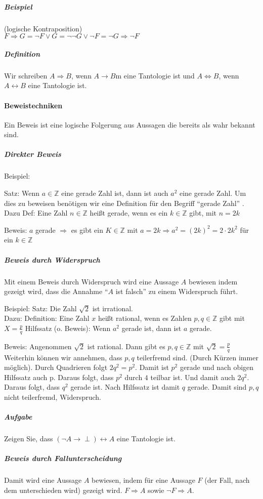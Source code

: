 \documentclass[a4paper]{scrartcl}
\begin{document}
\subparagraph{Beispiel} (logische Kontraposition)\\
$F \Rightarrow G = \neg F \vee G = \neg \neg G \vee \neg F = \neg G \Rightarrow \neg F$

\subparagraph{Definition}
Wir schreiben $A\Rightarrow B$, wenn $A\rightarrow B$m eine Tantologie ist und $A \Leftrightarrow B$, wenn $A\leftrightarrow B$ eine Tantologie ist.


\paragraph{Beweistechniken}
Ein Beweis ist eine logische Folgerung aus Aussagen die bereits als wahr bekannt sind.
\subparagraph{Direkter Beweis}
Beispiel:

Satz: Wenn $a\in \mathbb{Z}$ eine gerade Zahl ist, dann ist auch $a^2$ eine gerade Zahl. Um dies zu beweisen benötigen wir eine Definition für den Begriff "`gerade Zahl"' . Dazu Def:
Eine Zahl $n\in \mathbb{Z}$ heißt gerade, wenn es ein $k \in \mathbb{Z}$ gibt, mit $n=2k$

Beweis:
$a$ gerade $\Rightarrow$ es gibt ein $K \in \mathbb{Z}$ mit $a=2k \Rightarrow a^2 = (2k)^2 = 2 \cdot 2 k^2$ für ein $k \in \mathbb{Z}$

\subparagraph{Beweis durch Widerspruch}

Mit einem Beweis durch Widerspruch wird eine Aussage $A$ bewiesen indem gezeigt wird, dass die Annahme "`$A$ ist falsch"' zu einem Widerspruch führt.

Beispiel: Satz: Die Zahl $\sqrt{2}$ ist irrational.\\
Dazu: Definition: Eine Zahl $x$ heißt rational, wenn es Zahlen $p,q \in \mathbb{Z}$ gibt mit $X=\frac{p}{q}$
Hilfssatz (o. Beweis): Wenn $a^2$ gerade ist, dann ist $a$ gerade.

Beweis: Angenommen $\sqrt{2}$ ist rational. Dann gibt es $p,q \in \mathbb{Z}$ mit $\sqrt{2}=\frac{p}{q}$ Weiterhin können wir annehmen, dass $p,q$ teilerfremd sind. (Durch Kürzen immer möglich). Durch Quadrieren folgt $2q^2 = p^2$. Damit ist $p^2$ gerade und nach obigen Hilfssatz auch p. Daraus folgt, dass $p^2$ durch $4$ teilbar ist. Und damit auch $2q^2$. Daraus folgt, dass $q^2$ gerade ist. Nach Hilfssatz ist damit $q$ gerade. Damit sind $p,q$ nicht teilerfremd, Widerspruch.

\subparagraph{Aufgabe}
Zeigen Sie, dass $(\neg A \rightarrow \perp) \leftrightarrow A$ eine Tantologie ist.

\subparagraph{Beweis durch Fallunterscheidung} Damit wird eine Aussage $A$ bewiesen, indem für eine Aussage $F$ (der Fall, nach dem unterschieden wird) gezeigt wird. $F \Rightarrow A$ sowie $\neg F \Rightarrow A$.
\end{document}
